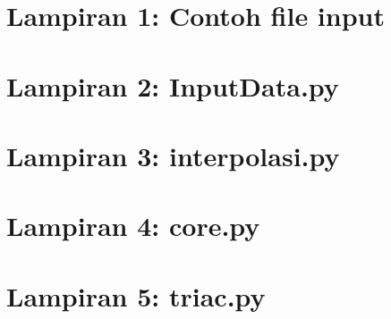 \chapter*{Lampiran 1: Contoh file input}
\label{lamp:inputExample}

%

\chapter*{Lampiran 2: InputData.py}
\scriptsize

\normalsize

\chapter*{Lampiran 3: interpolasi.py}
\scriptsize

\normalsize

\chapter*{Lampiran 4: core.py}
\scriptsize

\normalsize

\chapter*{Lampiran 5: triac.py}
\scriptsize

\normalsize
